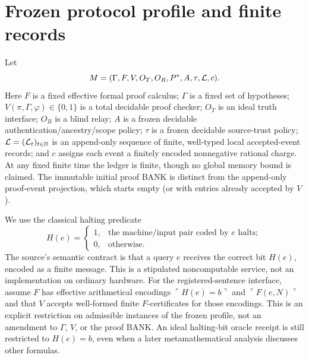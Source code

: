 \documentclass[11pt,letterpaper]{article}
\begin{document}
\section{Frozen protocol profile and finite records}
\begin{definition}
Let
\[
M=(\Gamma,F,V,O_T,O_R,P^*,A,\tau,\mathcal L,c).
\]
Here $F$ is a fixed effective formal proof calculus; $\Gamma$ is a fixed set of hypotheses; $V(\pi,\Gamma,\varphi)\in\{0,1\}$ is a total decidable proof checker; $O_T$ is an ideal truth interface; $O_R$ is a blind relay; $A$ is a frozen decidable authentication/ancestry/scope policy; $\tau$ is a frozen decidable source-trust policy; $\mathcal L=(\mathcal L_t)_{t\in\mathbb N}$ is an append-only sequence of finite, well-typed local accepted-event records; and $c$ assigns each event a finitely encoded nonnegative rational charge. At any fixed finite time the ledger is finite, though no global memory bound is claimed. The immutable initial proof BANK is distinct from the append-only proof-event projection, which starts empty (or with entries already accepted by $V$).
\end{definition}
We use the classical halting predicate
\[
H(e)=\begin{cases}1,&\text{the machine/input pair coded by $e$ halts};\\0,&\text{otherwise}.\end{cases}
\]
The source's semantic contract is that a query $e$ receives the correct bit $H(e)$, encoded as a finite message. This is a stipulated noncomputable service, not an implementation on ordinary hardware. For the registered-sentence interface, assume $F$ has effective arithmetical encodings $\ulcorner H(e)=b\urcorner$ and $\ulcorner F(e,N)\urcorner$ and that $V$ accepts well-formed finite $F$-certificates for those encodings. This is an explicit restriction on admissible instances of the frozen profile, not an amendment to $\Gamma$, $V$, or the proof BANK. An ideal halting-bit oracle receipt is still restricted to $H(e)=b$, even when a later metamathematical analysis discusses other formulas.
\end{document}

